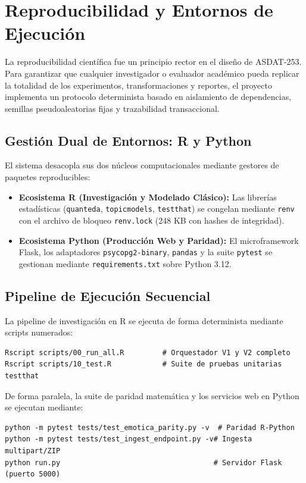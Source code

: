 \section{Reproducibilidad y Entornos de Ejecución}
\label{sec:reproducibilidad}

La reproducibilidad científica fue un principio rector en el diseño de ASDAT-253. Para garantizar que cualquier investigador o evaluador académico pueda replicar la totalidad de los experimentos, transformaciones y reportes, el proyecto implementa un protocolo determinista basado en aislamiento de dependencias, semillas pseudoaleatorias fijas y trazabilidad transaccional.

\subsection{Gestión Dual de Entornos: R y Python}

El sistema desacopla sus dos núcleos computacionales mediante gestores de paquetes reproducibles:
\begin{itemize}
  \item \textbf{Ecosistema R (Investigación y Modelado Clásico):} Las librerías estadísticas (\texttt{quanteda}, \texttt{topicmodels}, \texttt{testthat}) se congelan mediante \texttt{renv} con el archivo de bloqueo \texttt{renv.lock} (248 KB con hashes de integridad).
  \item \textbf{Ecosistema Python (Producción Web y Paridad):} El microframework Flask, los adaptadores \texttt{psycopg2-binary}, \texttt{pandas} y la suite \texttt{pytest} se gestionan mediante \texttt{requirements.txt} sobre Python 3.12.
\end{itemize}

\subsection{Pipeline de Ejecución Secuencial}

La pipeline de investigación en R se ejecuta de forma determinista mediante scripts numerados:
\begin{verbatim}
Rscript scripts/00_run_all.R         # Orquestador V1 y V2 completo
Rscript scripts/10_test.R            # Suite de pruebas unitarias testthat
\end{verbatim}

De forma paralela, la suite de paridad matemática y los servicios web en Python se ejecutan mediante:
\begin{verbatim}
python -m pytest tests/test_emotica_parity.py -v  # Paridad R-Python
python -m pytest tests/test_ingest_endpoint.py -v# Ingesta multipart/ZIP
python run.py                                    # Servidor Flask (puerto 5000)
\end{verbatim}


